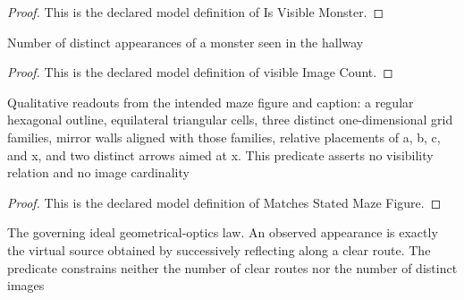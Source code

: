 \begin{proof}
  This is the declared model definition of Is Visible Monster.
\end{proof}
\begin{definition}
  \label{def:physics:phyx-mini-0164:phyxminiproblems-problemphyxmini0164-visibleimagecount}
  Number of distinct appearances of a monster seen in the hallway
\end{definition}
\begin{proof}
  This is the declared model definition of visible Image Count.
\end{proof}
\begin{definition}
  \label{def:physics:phyx-mini-0164:phyxminiproblems-problemphyxmini0164-matchesstatedmazefigure}
  Qualitative readouts from the intended maze figure and caption: a regular hexagonal outline, equilateral triangular cells, three distinct one-dimensional grid families, mirror walls aligned with those families, relative placements of a, b, c, and x, and two distinct arrows aimed at x. This predicate asserts no visibility relation and no image cardinality
\end{definition}
\begin{proof}
  This is the declared model definition of Matches Stated Maze Figure.
\end{proof}
\begin{definition}
  \label{def:physics:phyx-mini-0164:phyxminiproblems-problemphyxmini0164-satisfiesidealmirrormazeoptics}
  The governing ideal geometrical-optics law. An observed appearance is exactly the virtual source obtained by successively reflecting along a clear route. The predicate constrains neither the number of clear routes nor the number of distinct images
\end{definition}
